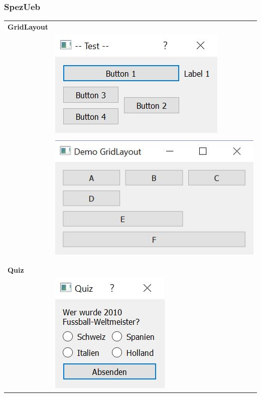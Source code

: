 \subsubsection{SpezUeb}
\begin{longtable}{l l} %
    \textbf{GridLayout}&\\
    &
    \hspace{-2cm}\includegraphics{images/qtSpezUeb1.jpg}
    \\&\\
    &
    \hspace{-2cm}\includegraphics{images/GridLayout.jpg}  
    \\ 
    \\&\\ 
    \textbf{Quiz}&\\
    &
    \includegraphics{images/qtSpezUeb2.jpg}

\end{longtable}
